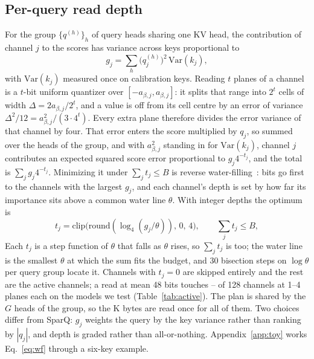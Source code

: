 \documentclass[10pt,twocolumn]{article}
\begin{document}
\subsection{Per-query read depth}
For the group $\{q^{(h)}\}_{h}$ of query heads sharing one KV head, the contribution of channel $j$ to the scores has variance across keys proportional to
\begin{equation}
g_j=\sum_{h}\big(q^{(h)}_j\big)^2\,\mathrm{Var}(k_j),
\label{eq:g}
\end{equation}
with $\mathrm{Var}(k_j)$ measured once on calibration keys. Reading $t$ planes of a channel is a $t$-bit uniform quantizer over $[-a_{\beta,j},a_{\beta,j}]$: it splits that range into $2^t$ cells of width $\Delta=2a_{\beta,j}/2^t$, and a value is off from its cell centre by an error of variance $\Delta^2/12=a_{\beta,j}^2/(3\cdot4^t)$. Every extra plane therefore divides the error variance of that channel by four. That error enters the score multiplied by $q_j$, so summed over the heads of the group, and with $a_{\beta,j}^2$ standing in for $\mathrm{Var}(k_j)$, channel $j$ contributes an expected squared score error proportional to $g_j4^{-t_j}$, and the total is $\sum_j g_j4^{-t_j}$. Minimizing it under $\sum_j t_j\le B$ is reverse water-filling~\cite{gershogray}: bits go first to the channels with the largest $g_j$, and each channel's depth is set by how far its importance sits above a common water line $\theta$. With integer depths the optimum is
\begin{equation}
t_j=\mathrm{clip}\big(\mathrm{round}(\log_4(g_j/\theta)),\,0,\,4\big),\qquad \sum_j t_j\le B,
\label{eq:wf}
\end{equation}
Each $t_j$ is a step function of $\theta$ that falls as $\theta$ rises, so $\sum_j t_j$ is too; the water line is the smallest $\theta$ at which the sum fits the budget, and 30 bisection steps on $\log\theta$ per query group locate it. Channels with $t_j=0$ are skipped entirely and the rest are the active channels; a read at mean 48 bits touches \activeFortyEightMin--\activeFortyEightMax{} of 128 channels at 1--4 planes each on the models we test (Table~\ref{tab:active}). The plan is shared by the $G$ heads of the group, so the K bytes are read once for all of them. Two choices differ from SparQ: $g_j$ weights the query by the key variance rather than ranking by $|q_j|$, and depth is graded rather than all-or-nothing. Appendix~\ref{app:toy} works Eq.~\ref{eq:wf} through a six-key example.
\end{document}
